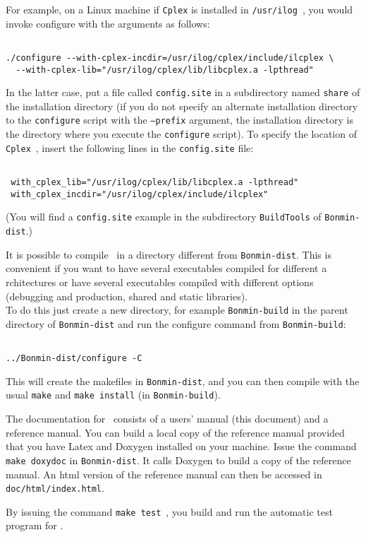 For example, on a Linux machine if {\tt Cplex} is installed in {\tt /usr/ilog}~, you would
invoke configure with the arguments as follows:
\begin{verbatim}

./configure --with-cplex-incdir=/usr/ilog/cplex/include/ilcplex \
  --with-cplex-lib="/usr/ilog/cplex/lib/libcplex.a -lpthread"
 \end{verbatim}
In the latter case, put a file called {\tt config.site} in a subdirectory named
{\tt share} of the installation directory (if you do not specify an alternate
installation directory to the {\tt configure} script with the {\tt --prefix}
argument, the installation directory is the directory where you execute the
{\tt configure} script). To specify the location of {\tt Cplex}~, insert the
following lines in the {\tt config.site} file:
 \begin{verbatim}

 with_cplex_lib="/usr/ilog/cplex/lib/libcplex.a -lpthread"
 with_cplex_incdir="/usr/ilog/cplex/include/ilcplex"
 \end{verbatim}
 (You will find a {\tt config.site} example in the subdirectory {\tt BuildTools} of {\tt Bonmin-dist}.)

It is possible to compile \Bonmin\ in a directory different from {\tt Bonmin-dist}.
This is convenient if you want to have several executables compiled for different a
rchitectures or have several executables compiled with different options
(debugging and production, shared and static libraries).\\

To do this just create a new directory, for example {\tt Bonmin-build} in the parent directory of
{\tt Bonmin-dist} and run the configure command from {\tt Bonmin-build}:
\begin{verbatim}

../Bonmin-dist/configure -C

\end{verbatim}
This will create the makefiles in {\tt Bonmin-dist}, and
you can then compile with the usual {\tt make} and {\tt make install}
(in {\tt Bonmin-build}).

The documentation for \Bonmin\ consists of a users' manual (this document) and a reference manual.
You can build a local copy of the reference manual provided that you have Latex
and Doxygen installed on your machine. Issue the command {\tt make
doxydoc} in {\tt Bonmin-dist}. It calls Doxygen to build a copy of the
reference manual. An html version of the reference manual can then
be accessed in {\tt doc/html/index.html}.


By issuing the command {\tt make test}~, you build and run the automatic test program for \Bonmin.

